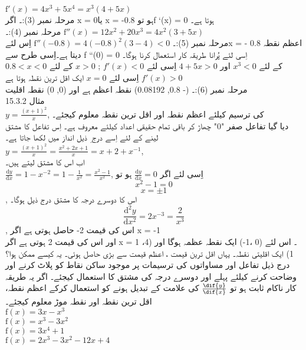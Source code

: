 \( \text{f}'(x) = 4x^{3} + 5x^{4} = x^{3}(4 + 5x) \)\\
مرحلہ نمبر (3):۔ اگر  x = 0یا x = -0.8 ہو توf `(x) = 0  ہوتا ہے۔ \\
مرحلہ نمبر (4):۔ 
\( \text{f}''(x) = 12x^{2} + 20x^{3} = 4x^{2}(3 + 5x) \)\\
مرحلہ نمبر (5):۔
\( \text{f}''(-0.8) = 4(-0.8)^2(3 - 4) < 0 \)
 اِس لئےx = - 0.8  اعظم نقطہ دیتا ہے۔اِسی طرح سے  f ``(0) = 0  اِسی لئے پُرانا طریقہ کار استعمال کرنا ہوگا۔\\
 \(0.8<x<0\)
  کے لئے
\(x^{3}<0\)
اور
\(4+5x>0\)
اِسی لئے
\(f'(x)<0\)
;
\(x>0\)
  کے لئے
  \(f'(x)>0\)
اِسی لئے
\(x=0\)
  ایک اقل ترین نقطہ ہوتا ہے\\
مرحلہ نمبر (6):۔ (- 0.8, 0.08192)  نقطہ اعظم  ہے  اور (0, 0)  نقطہ اقلیت \\
15.3.2 مثال\\
\( y = \frac{(x+1)^2}{x} \),
  کی ترسیم کیلئے اعظم نقطہ اور اقل ترین نقطہ معلوم کیجئے۔\\
دیا گیا تفاعل صفر "0" چھاڑ کر باقی تمام حقیقی اعداد کیلئے معروف  ہے۔ 
اِس تفاعل کا مشتق لینے کے لئے اِسے درج  ِ ذیل انداز میں لکھا جاتا ہے۔\\
 \( y = \frac{(x+1)^2}{x} = \frac{x^{2} + 2x +1}{x} = x + 2 + x^{-1}\),\\
اب اس کا مشتق لیتے ہیں۔\\
 \( \frac{\text{d}y}{\text{d}x} = 1 - x^{-2} = 1 - \frac{1}{x^2} = \frac{x^2 - 1}{x^2} \),
اِسی لئے اگر
\( \frac{\text{d}y}{\text{d}x} = 0 \)
  ہو تو \\
\[ x^2 - 1 = 0\] 
\[x = \pm1 \], 
اس کا دوسرے درجہ کا مشتق درج  ذیل ہوگا۔\\
\[\frac{\text{d}^2y}{\text{d}x^2} = 2x^{-3} = \frac{2}{x^3} \],
اس کی قیمت 2- حاصل ہوتی ہے اگر x = -1	\\
اور اس کی قیمت 2 ہوتی ہے اگر x = 1 ۔ اس لئے (0 ،1-) ایک نقطہ عظمہ ہوگا  اور (4، 1) ایک اقلیتی نقطہ۔ 
یہاں اقل ترین قیمت ، اعظم قیمت سے بڑی حاصل ہوئی۔ یہ کیسے ممکن ہوا؟\\
درج ذیل تفاعل اور مساواتوں کی ترسیمات پر موجود ساکن نقاط  کو پلاٹ کرنے اور وضاحت کرنے کیلئے پہلے اور دوسرے درجہ کی مشتق کا استعمال کیجئے۔ اگر یہ طریقہ کار ناکام ثابت ہو تو
\(\frac{\dif{y}}{\dif{x}}\)
 کی علامت کے تبدیل ہونے کو استعمال کرکے اعظم نقطہ، اقل ترین نقطہ اور نقطہ موڑ معلوم کیجئے۔ \\
 \( \text{f}(x) = 3x - x^3 \)\\
\( \text{f}(x) = x^3 - 3x^2 \)\\
\( \text{f}(x) = 3x^4 + 1 \)\\
\( \text{f}(x) = 2x^3 - 3x^2 - 12x + 4 \)\\
